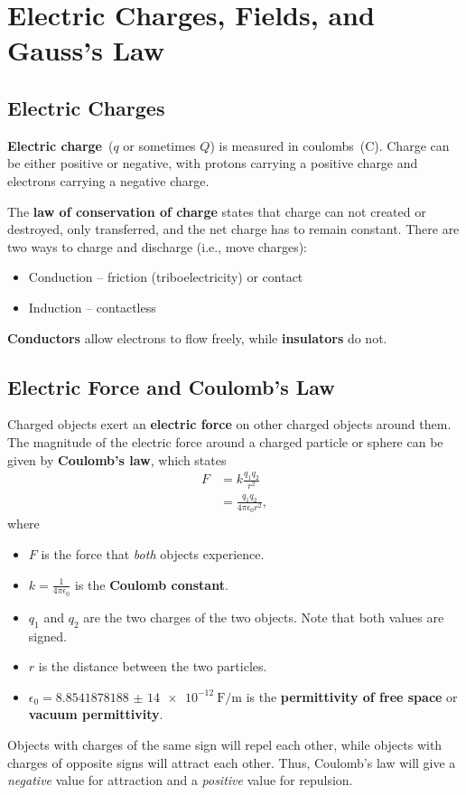 \chapter{Electric Charges, Fields, and Gauss's Law}

\section{Electric Charges} \label{sec:electric-charges}

\textbf{Electric charge}~(\(q\) or sometimes \(Q\))
is measured in coulombs~(\unit{\coulomb}).
Charge can be either positive or negative,
with protons carrying a positive charge and electrons carrying a
negative charge.

The \textbf{law of conservation of  charge} states that charge can
not created or destroyed,
only transferred,
and the net charge has to remain constant.
There are two ways to charge and discharge (i.e., move charges):
\begin{itemize}
    \item Conduction -- friction (triboelectricity) or contact
    \item Induction -- contactless
\end{itemize}

\textbf{Conductors} allow electrons to flow freely,
while \textbf{insulators} do not.
\vfil

\section{Electric Force and Coulomb's Law}

Charged objects exert an \textbf{electric force} on other charged
objects around them.
The magnitude of the electric force around a charged particle or
sphere can be given by \textbf{Coulomb's law},
which states
\begin{equation} \label{eq:coulombs-law}
    \begin{aligned}
        F &= k \frac{q_1 q_2}{r^2} \\
        &= \frac{q_1 q_2}{4 \pi \epsilon_0 r^2},
    \end{aligned}
\end{equation}
where
\begin{itemize}
    \item \(F\) is the force that \emph{both} objects experience.
    \item \(k = \frac{1}{4 \pi \epsilon_0}\) is the \textbf{Coulomb constant}.
    \item \(q_1\) and \(q_2\) are the two charges of the two objects.
        Note that both values are signed.
    \item \(r\) is the distance between the two particles.
    \item \(\epsilon_0 = \qty{8.854 187 8188(14)e-12}{\farad \per \metre}\)
        is the \textbf{permittivity of free space}
        or \textbf{vacuum permittivity}. \autocite{nist-epsilon_0}
\end{itemize}
Objects with charges of the same sign will repel each other,
while objects with charges of opposite signs will attract each other.
Thus, Coulomb's law will give a \emph{negative} value for attraction
and a \emph{positive} value for repulsion.

